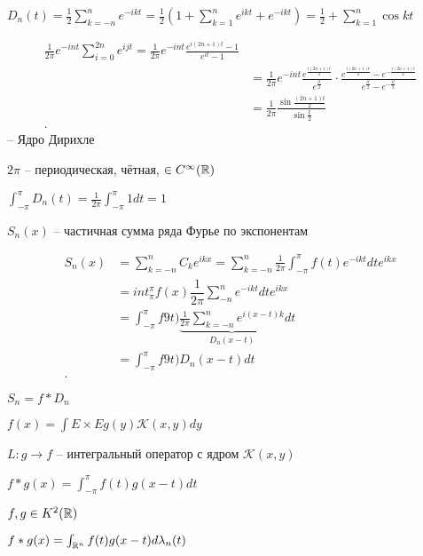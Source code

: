 \begin{definition}
    $D_n(t) = \frac{1}{2} \sum_{k=-n}^{n} e^{-ikt} = \frac{1}{2}\left(1 + \sum_{k=1}^{n} e^{ikt} + e^{-ikt}\right) = \frac{1}{2} + \sum_{k=1}^{n} \cos kt$

    \begin{align*}
        \frac{1}{2\pi} e^{-int} \sum_{i=0}^{2n} e^{ijt} = \frac{1}{2\pi}e^{-int} \frac{e^{i(2n+1)t} - 1}{e^{it} - 1}\\
        &= \frac{1}{2\pi}e^{-int} \frac{e^{\frac{i(2n+1)t}{2}}}{e^{\frac{it}{2}}} \cdot \frac{e^{\frac{i(2n+1)t}{2}} - e^{-\frac{i(2n+1)t}{2}}}{e^{\frac{it}{2}} - e^{-\frac{it}{2}}} \\
        &= \frac{1}{2\pi} \frac{\sin \frac{(2n+1)t}{2}}{\sin \frac{t}{2}} \\
    .\end{align*}
    -- Ядро Дирихле
\end{definition}

\begin{property}
    $2\pi$ -- периодическая, чётная, $\in C^{\infty }(\mathbb{R})$

    $\int_{-\pi}^{\pi} D_n(t) = \frac{1}{2\pi} \int_{-\pi}^{\pi}1 dt = 1$
\end{property}

\begin{definition}
    $S_n(x)$ -- частичная сумма ряда Фурье по экспонентам

    \begin{align*}
        S_n(x) &= \sum_{k=-n}^{n} C_k e^{ikx} = \sum_{k=-n}^{n} \frac{1}{2\pi} \int_{-\pi}^{\pi} f(t)e^{-ikt}dt e^{ikx} \\
        &=int_{\pi}^\pi f(x) \dfrac{1}{2\pi}\sum_{-n}^n e ^{-ik t} dt e ^{ik x}\\
        &= \int_{-\pi}^{\pi} f9t) \underbrace{\frac{1}{2\pi} \sum_{k=-n}^{n} e^{i(x-t)k}}_{D_n(x - t)}dt \\
        &= \int_{-\pi}^{\pi} f9t)D_n(x-t)dt \\
    .\end{align*}

    $S_n = f\ast D_n$
\end{definition}

\begin{note}
    $f(x) = \int{E\times E} g(y)\mathcal K(x,y)dy$

    $L: g\to f$ -- интегральный оператор с ядром $\mathcal K(x,y)$
\end{note}

\begin{definition}

    $f \ast g (x) = \int_{-\pi}^{\pi} f(t)g(x-t)dt$

    $f, g\in K^2(\mathbb{R})$

    $f\ast g(x) = \int_{\mathbb{R}^n} f(t)g(x-t) d\lambda_n(t)$
\end{definition}

